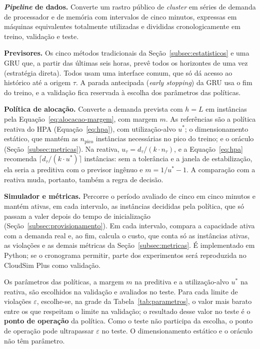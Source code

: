 \textbf{\textit{Pipeline} de dados.} Converte um rastro público de \textit{cluster} em séries de demanda de processador e de memória com intervalos de cinco minutos, expressas em máquinas equivalentes totalmente utilizadas e divididas cronologicamente em treino, validação e teste.

\textbf{Previsores.} Os cinco métodos tradicionais da Seção~\ref{subsec:estatisticos} e uma GRU que, a partir das últimas seis horas, prevê todos os horizontes de uma vez (estratégia direta). Todos usam uma interface comum, que só dá acesso ao histórico até a origem $\tau$. A parada antecipada (\textit{early stopping}) da GRU usa o fim do treino, e a validação fica reservada à escolha dos parâmetros das políticas.

\textbf{Política de alocação.} Converte a demanda prevista com $h = L$ em instâncias pela Equação~\ref{eq:alocacao-margem}, com margem $m$. As referências são a política reativa do HPA (Equação~\ref{eq:hpa}), com utilização-alvo $u^{*}$; o dimensionamento estático, que mantém as $n_{\mathrm{pico}}$ instâncias necessárias no pico do treino; e o oráculo (Seção~\ref{subsec:metricas}). Na reativa, $u_\tau = d_\tau / (k \cdot n_\tau)$, e a Equação~\ref{eq:hpa} recomenda $\lceil d_\tau / (k \cdot u^{*}) \rceil$ instâncias: sem a tolerância e a janela de estabilização, ela seria a preditiva com o previsor ingênuo e $m = 1/u^{*} - 1$. A comparação com a reativa muda, portanto, também a regra de decisão.

\textbf{Simulador e métricas.} Percorre o período avaliado de cinco em cinco minutos e mantém ativas, em cada intervalo, as instâncias decididas pela política, que só passam a valer depois do tempo de inicialização (Seção~\ref{subsec:provisionamento}). Em cada intervalo, compara a capacidade ativa com a demanda real e, ao fim, calcula o custo, que conta só as instâncias ativas, as violações e as demais métricas da Seção~\ref{subsec:metricas}. É implementado em Python; se o cronograma permitir, parte dos experimentos será reproduzida no CloudSim Plus \cite{silvafilho2017cloudsimplus} como validação.

Os parâmetros das políticas, a margem $m$ na preditiva e a utilização-alvo $u^{*}$ na reativa, são escolhidos na validação e avaliados no teste. Para cada limite de violações $\varepsilon$, escolhe-se, na grade da Tabela~\ref{tab:parametros}, o valor mais barato entre os que respeitam o limite na validação; o resultado desse valor no teste é o \textbf{ponto de operação} da política. Como o teste não participa da escolha, o ponto de operação pode ultrapassar $\varepsilon$ no teste. O dimensionamento estático e o oráculo não têm parâmetro.


